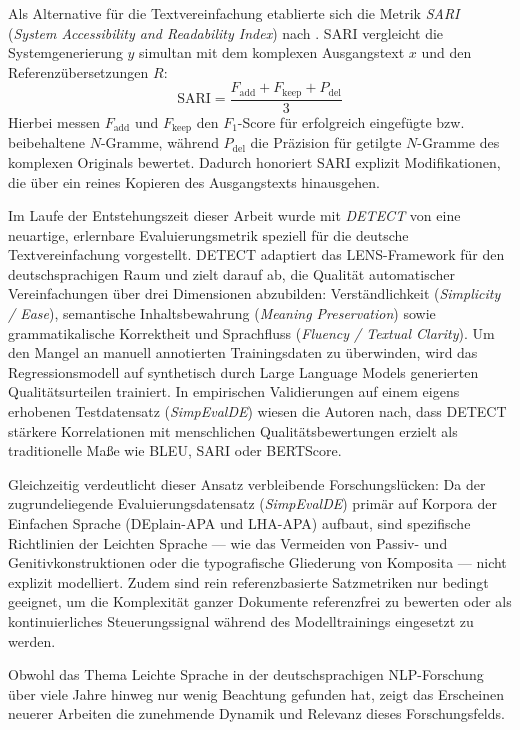 Als Alternative für die Textvereinfachung etablierte sich die Metrik \textit{SARI} (\textit{System Accessibility and Readability Index}) nach \citet{xu2016optimizing}. SARI vergleicht die Systemgenerierung $y$ simultan mit dem komplexen Ausgangstext $x$ und den Referenzübersetzungen $R$:
\begin{equation}
    \text{SARI} = \frac{F_{\text{add}} + F_{\text{keep}} + P_{\text{del}}}{3}
\end{equation}
Hierbei messen $F_{\text{add}}$ und $F_{\text{keep}}$ den $F_1$-Score für erfolgreich eingefügte bzw. beibehaltene $N$-Gramme, während $P_{\text{del}}$ die Präzision für getilgte $N$-Gramme des komplexen Originals bewertet. Dadurch honoriert SARI explizit Modifikationen, die über ein reines Kopieren des Ausgangstexts hinausgehen.

Im Laufe der Entstehungszeit dieser Arbeit wurde mit \textit{DETECT} von \citet{korobeynikova2024detect} eine neuartige, erlernbare Evaluierungsmetrik speziell für die deutsche Textvereinfachung vorgestellt. DETECT adaptiert das LENS-Framework für den deutschsprachigen Raum und zielt darauf ab, die Qualität automatischer Vereinfachungen über drei Dimensionen abzubilden: Verständlichkeit (\textit{Simplicity / Ease}), semantische Inhaltsbewahrung (\textit{Meaning Preservation}) sowie grammatikalische Korrektheit und Sprachfluss (\textit{Fluency / Textual Clarity}). Um den Mangel an manuell annotierten Trainingsdaten zu überwinden, wird das Regressionsmodell auf synthetisch durch Large Language Models generierten Qualitätsurteilen trainiert. In empirischen Validierungen auf einem eigens erhobenen Testdatensatz (\textit{SimpEvalDE}) wiesen die Autoren nach, dass DETECT stärkere Korrelationen mit menschlichen Qualitätsbewertungen erzielt als traditionelle Maße wie BLEU, SARI oder BERTScore.

Gleichzeitig verdeutlicht dieser Ansatz verbleibende Forschungslücken: Da der zugrundeliegende Evaluierungsdatensatz (\textit{SimpEvalDE}) primär auf Korpora der Einfachen Sprache (DEplain-APA und LHA-APA) aufbaut, sind spezifische Richtlinien der Leichten Sprache — wie das Vermeiden von Passiv- und Genitivkonstruktionen oder die typografische Gliederung von Komposita — nicht explizit modelliert. Zudem sind rein referenzbasierte Satzmetriken nur bedingt geeignet, um die Komplexität ganzer Dokumente referenzfrei zu bewerten oder als kontinuierliches Steuerungssignal während des Modelltrainings eingesetzt zu werden.

Obwohl das Thema Leichte Sprache in der deutschsprachigen NLP-Forschung über viele Jahre hinweg nur wenig Beachtung gefunden hat, zeigt das Erscheinen neuerer Arbeiten die zunehmende Dynamik und Relevanz dieses Forschungsfelds.

